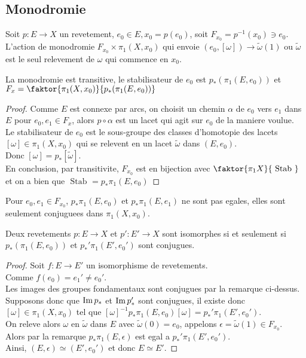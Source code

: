 \documentclass[../main.tex]{subfiles}
\begin{document}
\subsection{Monodromie}
Soit $p: E \to X $ un revetement, $e_0\in E, x_0 = p( e_0) $, soit $F_{x_0} = p^{-1}( x_0) \ni e_0$.\\
L'action de monodromie $F_{x_0} \times \pi_1( X,x_0) $ qui envoie $ ( e_0, [ \omega] ) \to \tilde \omega ( 1) $ ou $\tilde \omega$ est le seul relevement de $\omega$ qui commence en $x_0$.
\begin{propo}
La monodromie est transitive, le stabilisateur de $e_0$ est $p_\ast( \pi_1( E,e_0) ) $ et $ F_x = \faktor{ \pi_1 ( X,x_0) }{ p_\ast ( \pi_1 ( E,e_0) ) }$ 
\end{propo}
\begin{proof}
Comme $E$ est connexe par arcs, on choisit un chemin $\alpha$ de $e_0$ vers $e_1$ dans $E$ pour $e_0, e_1\in F_x$, alors $p\circ\alpha$ est un lacet qui agit sur $e_0$ de la maniere voulue.\\
Le stabilisateur de $e_0$ est le sous-groupe des classes d'homotopie des lacets $ [ \omega] \in \pi_1( X,x_0) $ qui se relevent en un lacet  $\tilde \omega$ dans $ ( E,e_0) $.\\
Donc $ [ \omega] = p_\ast [ \tilde \omega] $.\\
En conclusion, par transitivite, $F_{ x_0} $ est en bijection avec $ \faktor{\pi_1 X}{ \text{ Stab } }$ et on a bien que $ \text{ Stab } = p_\ast \pi_1( E,e_0) $ 
\end{proof}
\begin{rmq}
Pour $e_0,e_1\in F_{x_0} $, $ p_\ast \pi_1( E,e_0)  $ et $ p_\ast \pi_1 ( E,e_1) $ ne sont pas egales, elles sont seulement conjuguees dans $ \pi_1( X,x_0) $.\\
\end{rmq}
\begin{propo}
Deux revetements $p: E\to X$ et $p': E'\to X$ sont isomorphes si et seulement si $ p_\ast ( \pi_1 ( E,e_0) ) $ et $ p_\ast'\pi_1( E',e_0') $ sont conjugues.
\end{propo}
\begin{proof}
Soit $f: E\to E'$ un isomorphisme de revetements.\\
Comme $f( e_0) = e_1'\neq e_0'$.\\
Les images des groupes fondamentaux sont conjugues par la remarque ci-dessus.\\
Supposons donc que $\operatorname{Im} p_\ast$ et $\operatorname{Im} p_\ast'$ sont conjugues, il existe donc $ [ \omega] \in \pi_1 ( X,x_0) $ tel que $ [ \omega]^{-1} p_\ast \pi_1( E,e_0) [ \omega] = p_\ast' \pi_1( E',e_0') $.\\
On releve alors $\omega$ en $\tilde \omega$ dans $E$ avec $\tilde \omega( 0) = e_0$, appelons $\epsilon = \tilde \omega( 1) \in F_{x_0} $.\\
Alors par la remarque $p_\ast \pi_1( E, \epsilon)$ est egal a $ p_\ast' \pi_1( E',e_0') $.\\
Ainsi, $( E, \epsilon) \simeq ( E', e_0') $ et donc $E\simeq E'$.
\end{proof}
\end{document}
